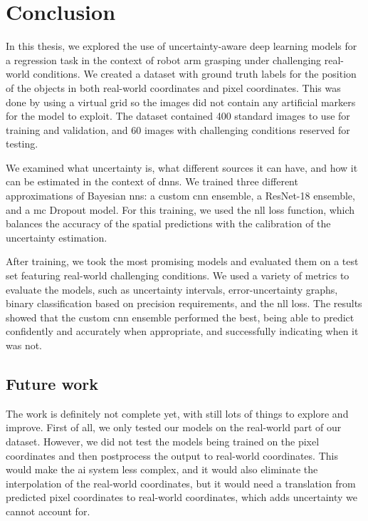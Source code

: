 
\chapter{Conclusion}\label{ch:conclusion}
In this thesis, we explored the use of uncertainty-aware deep learning models for a regression task in the context of robot arm grasping under challenging real-world conditions.
We created a dataset with ground truth labels for the position of the objects in both real-world coordinates and pixel coordinates.
This was done by using a virtual grid so the images did not contain any artificial markers for the model to exploit.
The dataset contained 400 standard images to use for training and validation, and 60 images with challenging conditions reserved for testing.

We examined what uncertainty is, what different sources it can have, and how it can be estimated in the context of \glspl{dnn}.
We trained three different approximations of Bayesian \glspl{nn}: a custom \gls{cnn} ensemble, a ResNet-18 ensemble, and a \gls{mc} Dropout model.
For this training, we used the \gls{nll} loss function, which balances the accuracy of the spatial predictions with the calibration of the uncertainty estimation.

After training, we took the most promising models and evaluated them on a test set featuring real-world challenging conditions.
We used a variety of metrics to evaluate the models, such as uncertainty intervals, error-uncertainty graphs, binary classification based on precision requirements, and the \gls{nll} loss.
The results showed that the custom \gls{cnn} ensemble performed the best, being able to predict confidently and accurately when appropriate, and successfully indicating when it was not.

\section{Future work} \label{ch:conclusion_section:future-work}
The work is definitely not complete yet, with still lots of things to explore and improve.
First of all, we only tested our models on the real-world part of our dataset.
However, we did not test the models being trained on the pixel coordinates and then postprocess the output to real-world coordinates.
This would make the \gls{ai} system less complex, and it would also eliminate the interpolation of the real-world coordinates, but it would need a translation from predicted pixel coordinates to real-world coordinates, which adds uncertainty we cannot account for.

